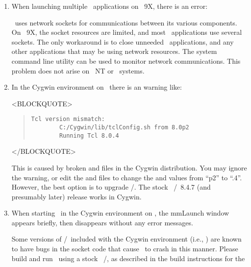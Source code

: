 \begin{enumerate}
\item {}When launching multiple \OOMMF\ applications on
  \Windows~9X, there is an error:
\begin{quote}
\raggedright
{}
\end{quote}
\OOMMF\ uses network sockets for communications between its various
components.  On \Windows~9X, the socket resources are limited, and
most \OOMMF\ applications use several sockets.  The only workaround is
to close unneeded \OOMMF\ applications, and any other applications
that may be using network resources.  The system command line utility
 can be used to monitor network communications.  This
problem does not arise on \Windows~NT or \Unix\ systems.

\item In the Cygwin environment on \Windows\, there is an warning like:
\begin{rawhtml}<BLOCKQUOTE>\end{rawhtml}
\begin{quote}
\begin{verbatim}
Tcl version mismatch:
        C:/Cygwin/lib/tclConfig.sh from 8.0p2
        Running Tcl 8.0.4
\end{verbatim}
\end{quote}
\begin{rawhtml}</BLOCKQUOTE>\end{rawhtml}
This is caused by broken  and  files
in the Cygwin distribution.  You may ignore the warning, or edit the
 and  files to change the
 and  values from ``p2'' to
``.4''.  However, the best option is to upgrade \Tcl/\Tk.  The stock
\Windows\ \Tcl/\Tk\ 8.4.7 (and presumably later) release works in Cygwin.

\item When starting \OOMMF\ in the Cygwin environment on \Windows, the
mmLaunch window appears briefly, then disappears without any error
messages.

Some versions of \Tcl/\Tk\ included with the Cygwin environment
(i.e., ) are known to have bugs in the socket code
that cause \OOMMF\ to crash in this manner.  Please build and run
\OOMMF\ using a stock \Windows\ \Tcl/\Tk, as described in the build
instructions for the


\end{enumerate}
